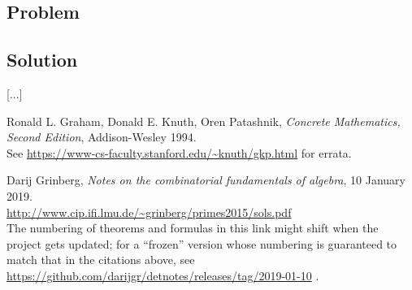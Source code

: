 \documentclass[paper=a4, fontsize=12pt]{scrartcl} %
\theoremstyle{plainsl}
\theoremstyle{definition}
\theoremstyle{remark}
\begin{document}
\subsection{Problem}

\subsection{Solution}

[...]

\begin{thebibliography}{99999999}                                                                                         %


Ronald L. Graham, Donald E. Knuth, Oren Patashnik,
\textit{Concrete Mathematics, Second Edition}, Addison-Wesley 1994.\\
See \url{https://www-cs-faculty.stanford.edu/~knuth/gkp.html} for errata.

Darij Grinberg,
\textit{Notes on the combinatorial fundamentals of algebra},
10 January 2019. \\
\url{http://www.cip.ifi.lmu.de/~grinberg/primes2015/sols.pdf}
\\
The numbering of theorems and formulas in this link might shift
when the project gets updated; for a ``frozen'' version whose
numbering is guaranteed to match that in the citations above, see
\url{https://github.com/darijgr/detnotes/releases/tag/2019-01-10} .

\end{thebibliography}
\end{document}
